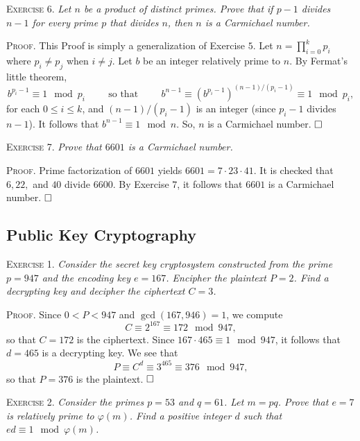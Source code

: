 \documentclass[11pt, leqno]{article}
\newcommand{\done}{\ensuremath{\hfill\square}}
\begin{document}
\textsc{Exercise 6}. \emph{Let $n$ be a product of distinct primes. Prove that if $p-1$ divides $n-1$ for every prime $p$ that divides $n$, then $n$ is a Carmichael number.}

\textsc{Proof}. This Proof is simply a generalization of Exercise $5$. Let $n = \prod_{i=0}^k p_i$ where $p_i \ne p_j$ when $i \ne j$. Let $b$ be an integer relatively prime to $n$. By Fermat's little theorem, 
\begin{displaymath}
b^{p_i-1} \equiv 1 \mod p_i \hspace{1cm} \text{so that} \hspace{1cm} b^{n-1} \equiv (b^{p_i-1})^{(n-1)/(p_i-1)} \equiv 1 \mod p_i,
\end{displaymath}
for each $0\leq i \leq k$, and $(n-1)/(p_i-1)$ is an integer (since $p_i-1$ divides $n-1$). It follows that $b^{n-1} \equiv 1 \mod n$. So, $n$ is a Carmichael number. \done

\textsc{Exercise 7}. \emph{Prove that $6601$ is a Carmichael number.}

\textsc{Proof}. Prime factorization of $6601$ yields $6601 = 7 \cdot 23 \cdot 41$. It is checked that $6, 22,$ and $40$ divide $6600$. By Exercise $7$, it follows that $6601$ is a Carmichael number. \done

\subsection{Public Key Cryptography}

\textsc{Exercise 1}. \emph{Consider the secret key cryptosystem constructed from the prime $p = 947$ and the encoding key $e = 167$. Encipher the plaintext $P=2$. Find a decrypting key and decipher the ciphertext $C=3$.}

\textsc{Proof}. Since $0< P < 947$ and $\gcd(167, 946) = 1$, we compute
\begin{displaymath}
C \equiv 2^{167} \equiv 172 \mod 947,
\end{displaymath}
so that $C = 172$ is the ciphertext. Since $167\cdot 465 \equiv 1 \mod 947$, it follows that $d=465$ is a decrypting key. We see that 
\begin{displaymath}
P \equiv C^d \equiv 3^{465} \equiv 376 \mod 947,
\end{displaymath}
so that $P = 376$ is the plaintext. \done

\textsc{Exercise 2}. \emph{Consider the primes $p=53$ and $q=61$. Let $m = pq$. Prove that $e=7$ is relatively prime to $\varphi(m)$. Find a positive integer $d$ such that $ed \equiv 1 \mod \varphi(m)$.}
\end{document}
